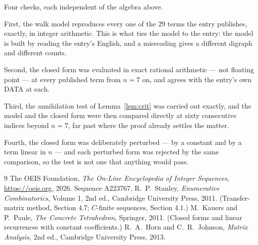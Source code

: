 \documentclass[11pt,a4paper]{article}
\theoremstyle{plain}
\theoremstyle{definition}
\begin{document}
Four checks, each independent of the algebra above.

First, the walk model reproduces every one of the $29$ terms the entry publishes,
exactly, in integer arithmetic. This is what ties the model to the entry: the model is built
by reading the entry's English, and a misreading gives a different digraph and different
counts.

Second, the closed form was evaluated in exact rational arithmetic --- not floating point ---
at every published term from $n=7$ on, and agrees with the entry's own DATA at each.

Third, the annihilation test of Lemma~\ref{lem:crit} was carried out exactly, and the model
and the closed form were then compared directly at sixty consecutive indices beyond
$n=7$, far past where the proof already settles the matter.

Fourth, the closed form was deliberately perturbed --- by a constant and by a term linear in
$n$ --- and each perturbed form was rejected by the same comparison, so the test is not one
that anything would pass.

\begin{thebibliography}{9}
 The OEIS Foundation, \emph{The On-Line Encyclopedia of Integer
Sequences}, \url{https://oeis.org}, 2026. Sequence A223767.
 R.~P.~Stanley, \emph{Enumerative Combinatorics}, Volume 1, 2nd ed.,
Cambridge University Press, 2011. (Transfer-matrix method, Section 4.7; $C$-finite sequences,
Section 4.1.)
 M.~Kauers and P.~Paule, \emph{The Concrete Tetrahedron}, Springer, 2011.
(Closed forms and linear recurrences with constant coefficients.)
 R.~A.~Horn and C.~R.~Johnson, \emph{Matrix Analysis}, 2nd ed., Cambridge
University Press, 2013.
\end{thebibliography}
\end{document}

